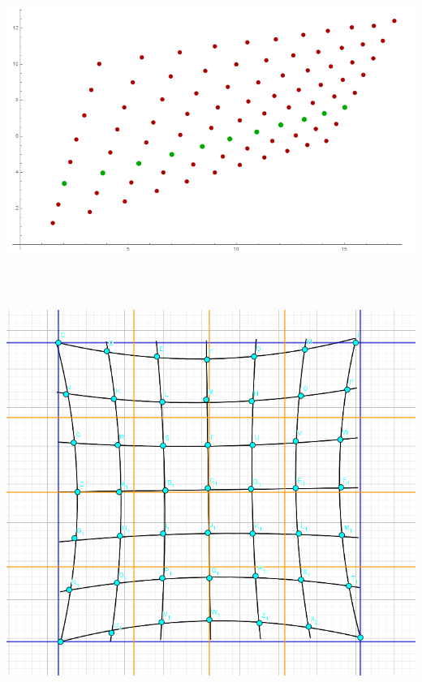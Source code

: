 \begin{minipage}{\linewidth}
	\centering
	\includegraphics[width=1\linewidth]{images/AlgPerspektifisch.png}
\end{minipage}\\\\

\begin{minipage}{\linewidth}
	\centering
	\includegraphics[width=.8\linewidth]{images/KissenVerzeichnung.png}
\end{minipage}\\


